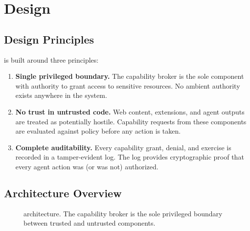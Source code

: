 
\section{Design}
\label{sec:design}

\subsection{Design Principles}

\ferrite{} is built around three principles:

\begin{enumerate}
  \item \textbf{Single privileged boundary.} The capability
    broker is the sole component with authority to grant access
    to sensitive resources. No ambient authority exists anywhere
    in the system.

  \item \textbf{No trust in untrusted code.} Web content,
    extensions, and agent outputs are treated as potentially
    hostile. Capability requests from these components are
    evaluated against policy before any action is taken.

  \item \textbf{Complete auditability.} Every capability grant,
    denial, and exercise is recorded in a tamper-evident log.
    The log provides cryptographic proof that every agent action
    was (or was not) authorized.
\end{enumerate}

\subsection{Architecture Overview}


\begin{figure}[h]
  \centering
  \caption{\ferrite{} architecture. The capability broker is
           the sole privileged boundary between trusted and
           untrusted components.}
  \label{fig:architecture}
\end{figure}

